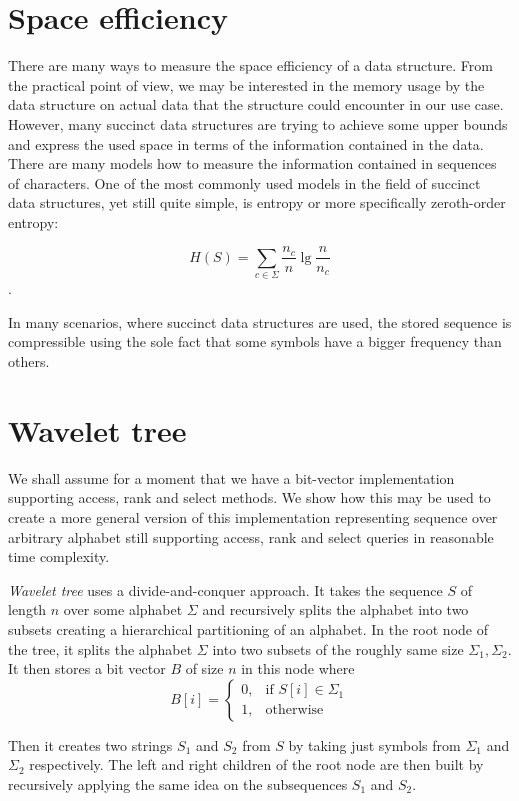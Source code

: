 \section{Space efficiency}

There are many ways to measure the space efficiency of a data structure. From the
practical point of view, we may be interested in the memory usage by the data
structure on actual data that the structure could encounter in our use case. However,
many succinct data structures are trying to achieve some upper bounds and express
the used space in terms of the information contained in the data. There are many
models how to measure the information contained in sequences of characters. One
of the most commonly used models in the field of succinct data structures, yet still
quite simple, is entropy or more specifically zeroth-order entropy:

$$H(S)=\sum_{c\in\Sigma} \frac{n_c}{n} \lg \frac{n}{n_c}$$.

In many scenarios, where succinct data structures are used, the stored sequence
is compressible using the sole fact that some symbols have a bigger frequency than others.

\section{Wavelet tree}
\label{section:WaweletTree}

We shall assume for a moment that we have a bit-vector implementation supporting
access, rank and select methods. We show how this may be used to create
a more general version of this implementation representing sequence over arbitrary
alphabet still supporting access, rank and select queries in reasonable time complexity.

\textit{Wavelet tree} uses a divide-and-conquer approach. It takes the sequence $S$ of
length $n$ over some alphabet $\Sigma$ and recursively splits the alphabet into
two subsets creating a hierarchical partitioning of an alphabet. In the root node
of the tree, it splits the alphabet $\Sigma$ into two subsets of the roughly same
size $\Sigma_1, \Sigma_2$. It then stores a bit vector $B$ of size $n$ in this node
where
\[
    B[i]= 
\begin{cases}
    0,& \text{if } S[i]\in \Sigma_1\\
    1,              & \text{otherwise}
\end{cases}
\]

Then it creates two strings $S_1$ and $S_2$ from $S$ by taking just symbols
from $\Sigma_1$ and $\Sigma_2$ respectively. The left and right children of the root node
are then built by recursively applying the same idea on the subsequences $S_1$ and $S_2$.

